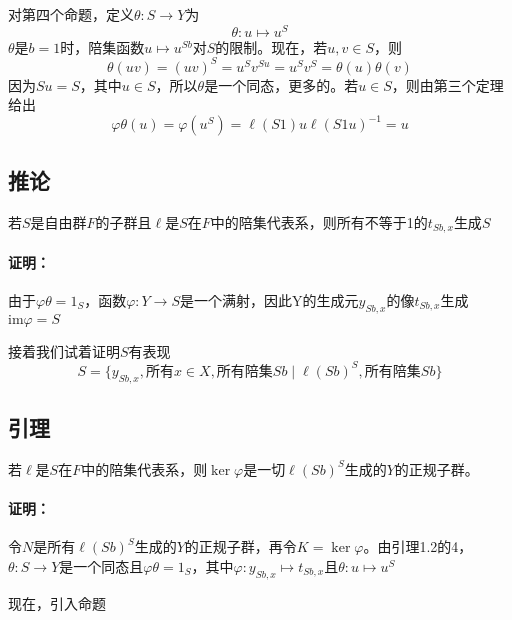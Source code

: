 \documentclass[UTF8]{article}
\begin{document}
	对第四个命题，定义$\theta:S\to Y$为
	$$
	\theta:u\mapsto u^S
	$$
	$\theta$是$b=1$时，陪集函数$u\mapsto u^{Sb}$对$S$的限制。现在，若$u,v\in S$，则
	$$
	\theta(uv) = (uv)^S = u^Sv^{Su} = u^Sv^S = \theta(u)\theta(v)
	$$
	因为$Su = S$，其中$u\in S$，所以$\theta$是一个同态，更多的。若$u\in S$，则由第三个定理给出
	$$
	\varphi\theta(u) = \varphi(u^S) = \ell(S1)u\ell(S1u)^{-1} = u
	$$
	\subsection{推论}
	
	若$S$是自由群$F$的子群且$\ell$是$S$在$F$中的陪集代表系，则所有不等于1的$ t_{Sb,x}$生成$S$
	
	\paragraph{证明：}由于$\varphi\theta = 1_S$，函数$\varphi:Y \to S$是一个满射，因此Y的生成元$y_{Sb,x}$的像$t_{Sb,x}$生成$\text{im}\varphi = S$
	
	接着我们试着证明$S$有表现
	$$
	S = \{y_{Sb,x},\text{所有}x\in X,\text{所有陪集}Sb\mid \ell(Sb)^S,\text{所有陪集}Sb\}
	$$
	
	\newpage
	\subsection{引理}若$\ell$是$S$在$F$中的陪集代表系，则$\ker\varphi$是一切$\ell(Sb)^S$生成的$Y$的正规子群。
	
	\paragraph{证明：}令$N$是所有$\ell(Sb)^S$生成的$Y$的正规子群，再令$K = \ker\varphi$。由引理1.2的4，$\theta:S\to Y$是一个同态且$\varphi\theta = 1_S$，其中$\varphi:y_{Sb,x} \mapsto t_{Sb,x}$且$\theta:u\mapsto u^S$
	
	现在，引入命题
	
\end{document}
